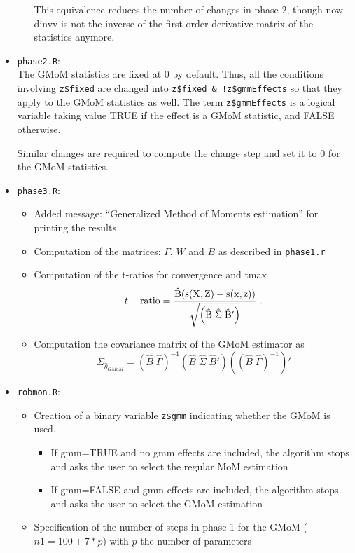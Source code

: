 \documentclass[a4paper,11pt]{article}
\begin{document}
\begin{itemize}
\begin{itemize}
This equivalence reduces the number of changes in phase 2, though now dinvv is not the inverse of the first order derivative matrix of the statistics anymore.
\end{itemize}

\item \texttt{phase2.R}:\\
The GMoM statistics are fixed at 0 by default. Thus, all the conditions involving \texttt{z\$fixed} are changed  into \texttt{z\$fixed \& !z\$gmmEffects} so that they apply to the GMoM statistics as well. The term \texttt{z\$gmmEffects} is a logical variable taking value TRUE if the effect is a GMoM statistic, and FALSE otherwise.

Similar changes are required to compute the change step and set it to 0 for the GMoM statistics.

\item \texttt{phase3.R}:\\
\begin{itemize}
	\item Added message: ``Generalized Method of Moments estimation'' for printing the results
	\item Computation of the matrices: $\Gamma$, $W$ and $B$ as described in \texttt{phase1.r}
	\item Computation of the t-ratios for convergence and tmax
	\[t-\rm{ratio} = \frac{\hat{B}(s(X,Z)-s(x,z))}
{\sqrt{ \left(\hat{B}\;\hat{\Sigma}\;\hat{B}' \right)}} \ .\]
	\item Computation the covariance matrix of the GMoM estimator as
\[\Sigma_{\widehat{\theta}_{GMoM}}=(\hat{B}\;\hat{\Gamma})^{-
1}(\hat{B}\;\hat{\Sigma}\;\hat{B}')((\hat{B}\;\hat{\Gamma})^{-1})'\]
\end{itemize}

\item \texttt{robmon.R}:
\begin{itemize}
	\item Creation of a binary variable \texttt{z\$gmm} indicating whether the GMoM is used.
\begin{itemize}
  \item If gmm=TRUE and no gmm effects are included, the algorithm stops and asks the user to select the regular MoM estimation
	\item If gmm=FALSE and gmm effects are included, the algorithm stops and asks the user to select the GMoM estimation
\end{itemize}
\item Specification of the number of steps in phase 1 for the GMoM ($n1=100 + 7 *p$) with $p$ the number of parameters
\end{itemize}



\end{itemize}
\end{document}

